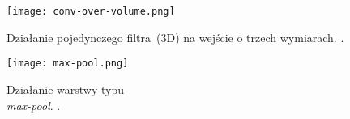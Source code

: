 \begin{figure}[ht]
	\centering
	\begin{minipage}[c]{0.45\textwidth}
		\texttt{[image: conv-over-volume.png]}
		\caption{Działanie pojedynczego filtra~(3D) na wejście o trzech wymiarach. .}
		\label{fig:conv-over-vol}
	\end{minipage}
	\hspace{3em}
	\begin{minipage}[c]{0.45\textwidth}
		\vspace{-0.5em}
		\texttt{[image: max-pool.png]}
		\vspace{1.5em}
		\caption{Działanie warstwy typu \\ \textit{max-pool}. .}
		\label{fig:max-pool}
	\end{minipage}	
\end{figure}




%
%
%
%
%

